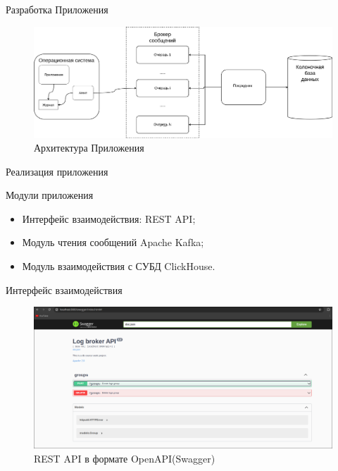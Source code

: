 \documentclass{beamer}
\begin{document}
\begin{frame}{Разработка Приложения}
	\begin{figure}[H]
		\centering
		\begin{minipage}[t]{1.2\textwidth}
			\centering
			\includegraphics[width=.7\textwidth]{./imgs/appscheme.png}
		\end{minipage}
		\caption{Архитектура Приложения}
	\end{figure}
\end{frame}


\begin{frame}{Реализация приложения}
	\begin{alertblock}{Модули приложения}
		\begin{itemize}
			\item Интерфейс взаимодействия: REST API;
			\item Модуль чтения сообщений Apache Kafka;
			\item Модуль взаимодействия с СУБД ClickHouse.
		\end{itemize}
	\end{alertblock}
\end{frame}

\begin{frame}{Интерфейс взаимодействия}
	\begin{figure}[H]
		\centering
		\includegraphics[width=.9\textwidth]{./imgs/swagger.png}
    \caption{REST API в формате OpenAPI(Swagger)}
	\end{figure}

\end{frame}
\end{document}
